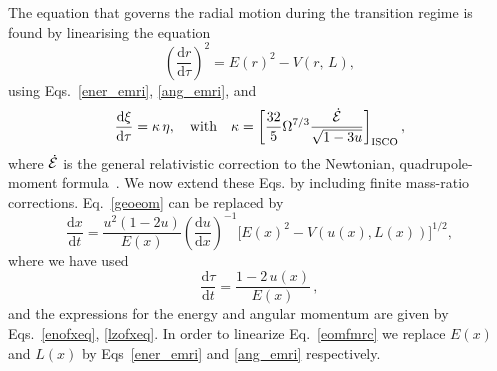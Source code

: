 \documentclass[aps,prd,showpacs,amssymb,floatfix,nofootinbib,superscriptaddress]{revtex4-1}%
\begin{document}
\noindent The equation that governs the radial motion during the transition regime is found by linearising the equation 
\begin{equation}
\left(\frac{{\mathrm{d}}r}{{\mathrm{d}}\tau}\right)^2 = E(r)^2 - V(r,\,L),
\label{geoeom}
\end{equation}
\noindent using Eqs.~\eqref{ener_emri}, \eqref{ang_emri}, and
\begin{equation}
\label{xi_eq}
\frac{{\mathrm{d}}\xi}{{\mathrm{d}}\tau}= \kappa\, \eta, \quad {\rm{with}} \quad \kappa =\bigg[\frac{32}{5}\Omega^{7/3} \frac{\dot{{\cal{E}}}}{\sqrt{1-3u}}\bigg]_{\rm{ISCO}} \,,
\end{equation}
\noindent where \(\dot{{\cal{E}}}\) is the general relativistic correction to the Newtonian, quadrupole-moment formula~\cite{ori}. We now extend these Eqs. by including finite mass-ratio corrections. Eq.~\eqref{geoeom} can be replaced by 
\begin{equation}
\frac{{\mathrm{d}}x}{{\mathrm{d}}t}= \frac{u^2(1-2u)}{E(x) }\left(\frac{{\mathrm{d}}u}{{\mathrm{d}}x}\right)^{-1} \bigg[E(x)^2 - V\left(u(x),L(x)\right)\bigg]^{1/2},
\label{eomfmrc}
\end{equation}
 \noindent where we have used
 \begin{equation}
 \frac{{\mathrm{d}}\tau}{{\mathrm{d}}t}= \frac{1-2\,u(x)}{E(x)}\,,
 \label{tfact}
 \end{equation}
\noindent and the expressions for the energy and angular momentum are given by Eqs.~\eqref{enofxeq}, \eqref{lzofxeq}. In order to linearize Eq.~\eqref{eomfmrc} we replace $E(x)$ and $L(x)$ by Eqs~\eqref{ener_emri} and \eqref{ang_emri} respectively.
\end{document}
